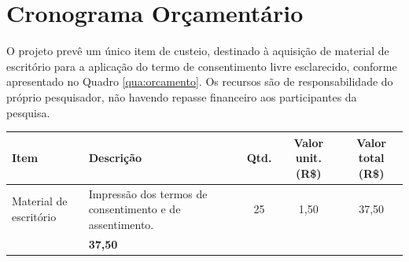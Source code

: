 \chapter{Cronograma Orçamentário}

O projeto prevê um único item de custeio, destinado à aquisição de material de escritório para a aplicação do termo de consentimento livre esclarecido, conforme apresentado no Quadro \ref{qua:orcamento}. Os recursos são de responsabilidade do próprio pesquisador, não havendo repasse financeiro aos participantes da pesquisa.

\begin{quadro}[htbp]
    \centering
    \caption{\label{qua:orcamento}Orçamento financeiro detalhado}
    \renewcommand{\arraystretch}{1.2}
    \begin{tabular}{|>{\raggedright\arraybackslash}p{2.4cm}|>{\raggedright\arraybackslash}p{4.6cm}|c|c|c|}
    \hline
    \textbf{Item} & \textbf{Descrição} & \textbf{Qtd.} & \textbf{Valor unit. (R\$)} & \textbf{Valor total (R\$)} \\ \hline
    Material de escritório & Impressão dos termos de consentimento e de assentimento. & 25 & 1,50 & 37,50 \\ \hline
    \multicolumn{4}{|r|}{\textbf{Total}} & \textbf{37,50} \\ \hline
    \end{tabular}
\end{quadro}
